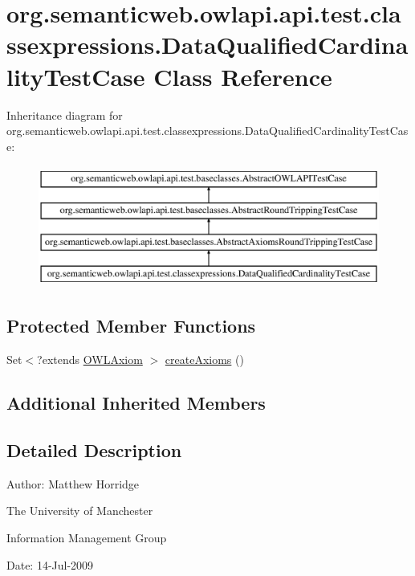 \hypertarget{classorg_1_1semanticweb_1_1owlapi_1_1api_1_1test_1_1classexpressions_1_1_data_qualified_cardinality_test_case}{\section{org.\-semanticweb.\-owlapi.\-api.\-test.\-classexpressions.\-Data\-Qualified\-Cardinality\-Test\-Case Class Reference}
\label{classorg_1_1semanticweb_1_1owlapi_1_1api_1_1test_1_1classexpressions_1_1_data_qualified_cardinality_test_case}
}
Inheritance diagram for org.\-semanticweb.\-owlapi.\-api.\-test.\-classexpressions.\-Data\-Qualified\-Cardinality\-Test\-Case\-:\begin{figure}[H]
\begin{center}
\leavevmode
\includegraphics[height=4.000000cm]{classorg_1_1semanticweb_1_1owlapi_1_1api_1_1test_1_1classexpressions_1_1_data_qualified_cardinality_test_case}
\end{center}
\end{figure}
\subsection*{Protected Member Functions}
\begin{DoxyCompactItemize}
\item 
Set$<$?extends \hyperlink{interfaceorg_1_1semanticweb_1_1owlapi_1_1model_1_1_o_w_l_axiom}{O\-W\-L\-Axiom} $>$ \hyperlink{classorg_1_1semanticweb_1_1owlapi_1_1api_1_1test_1_1classexpressions_1_1_data_qualified_cardinality_test_case_a81e2a63fa5ff7acf2666addb9de4108d}{create\-Axioms} ()
\end{DoxyCompactItemize}
\subsection*{Additional Inherited Members}


\subsection{Detailed Description}
Author\-: Matthew Horridge\par
 The University of Manchester\par
 Information Management Group\par
 Date\-: 14-\/\-Jul-\/2009 

